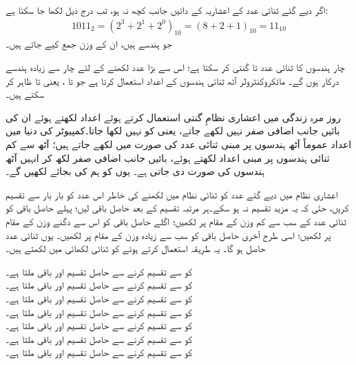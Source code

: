 اگر دیے گئے ثنائی عدد کے اعشاریہ کے دائیں جانب کچھ نہ ہو، تب درج ذیل لکھا جا سکتا ہے:
\begin{align}
1011_2=(2^3+2^1+2^0)_{10}=(8+2+1)_{10}=11_{10}
\end{align}
 جو ہندسے  ہیں، ان کے وزن جمع کیے جاتے ہیں۔

چار ہندسوں کا ثنائی عدد  تا  گنتی کر سکتا ہے؛ اس سے بڑا عدد لکھنے کے لئے چار سے زیادہ ہندسے درکار ہوں گے۔ مائکروکنٹرولر آٹھ ثنائی ہندسوں کے اعداد استعمال کرتا ہے جو  تا ، یعنی  تا  ظاہر کر سکتے ہیں۔

روز مرہ زندگی میں اعشاری نظامِ گنتی استعمال کرتے ہوئے اعداد لکھتے ہوئے ان کی بائیں جانب اضافی صفر نہیں لکھے جاتے، یعنی  کو  نہیں لکھا جاتا۔کمپیوٹر کی دنیا میں اعداد عموماً آٹھ ہندسوں پر مبنی ثنائی عدد کی صورت میں لکھے جاتے ہیں؛ آٹھ سے کم ثنائی ہندسوں پر مبنی اعداد لکھتے ہوئے، بائیں جانب اضافی صفر لکھ کر انہیں آٹھ ہندسوں کی صورت دی جاتی ہے۔ یوں  کو ہم  کی بجائے  لکھیں گے۔

اعشاری نظام میں دیے گئے عدد کو ثنائی نظام میں لکھنے کی خاطر اس عدد کو بار بار  سے تقسیم کریں، حتٰی کہ یہ مزید تقسیم نہ ہو سکے۔ہر مرتبہ تقسیم کے بعد حاصل باقی لیں؛ پہلے حاصل باقی کو ثنائی عدد کے سب سے کم وزن کے مقام پر لکھیں؛ اگلے حاصل باقی کو اس سے دگنے وزن کے مقام پر لکھیں؛ اسی طرح آخری حاصل باقی کو سب سے زیادہ وزن کے مقام پر لکھیں۔ یوں ثنائی عدد حاصل ہو گا۔	یہ طریقہ استعمال کرتے ہوئے  کو ثنائی لکھائی میں لکھتے ہیں۔

 کو  سے تقسیم کرنے سے حاصل تقسیم  اور باقی  ملتا ہے۔\\
 کو  سے تقسیم کرنے سے حاصل تقسیم  اور باقی  ملتا ہے۔\\
 کو  سے تقسیم کرنے سے حاصل تقسیم  اور باقی  ملتا ہے۔\\
 کو  سے تقسیم کرنے سے حاصل تقسیم  اور باقی  ملتا ہے۔\\
 کو  سے تقسیم کرنے سے حاصل تقسیم  اور باقی  ملتا ہے۔\\
 کو  سے تقسیم کرنے سے حاصل تقسیم  اور باقی  ملتا ہے۔\\
 کو  سے تقسیم کرنے سے حاصل تقسیم  اور باقی  ملتا ہے۔


